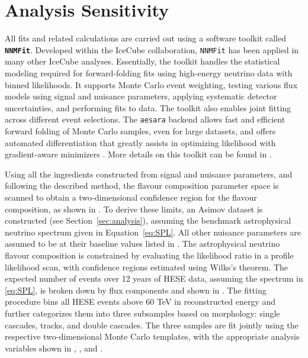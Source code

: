 \section{Analysis Sensitivity}
\label{sec:sensitivty}
All fits and related calculations are carried out using a software toolkit called \textbf{\texttt{NNMFit}}. Developed within the IceCube collaboration, \texttt{NNMFit} has been applied in many other IceCube analyses. Essentially, the toolkit handles the statistical modeling required for forward-folding fits using high-energy neutrino data with binned likelihoods. It supports Monte Carlo event weighting, testing various flux models using signal and nuisance parameters, applying systematic detector uncertainties, and performing fits to data. The toolkit also enables joint fitting across different event selections. The \texttt{aesara} backend  allows fast and efficient forward folding of Monte Carlo samples, even for large datasets, and offers automated differentiation that greatly assists in optimizing likelihood with gradient-aware minimizers . More details on this toolkit can be found in . 

Using all the ingredients constructed from signal and nuisance parameters, and following the described method, the flavour composition parameter space is scanned to obtain a two-dimensional confidence region for the flavour composition, as shown in . To derive these limits, an Asimov dataset is constructed (see Section~\ref{sec:analysis}), assuming the benchmark astrophysical neutrino spectrum given in Equation~\ref{eq:SPL}. All other nuisance parameters are assumed to be at their baseline values listed in . The astrophysical neutrino flavour composition is constrained by evaluating the likelihood ratio in a profile likelihood scan, with confidence regions estimated using Wilks’s theorem. The expected number of events over 12 years of HESE data, assuming the spectrum in \ref{eq:SPL}, is broken down by flux components and shown in . The fitting procedure bins all HESE events above 60 TeV in reconstructed energy and further categorizes them into three subsamples based on morphology: single cascades, tracks, and double cascades. The three samples are fit jointly using the respective two-dimensional Monte Carlo templates, with the appropriate analysis variables shown in , , and .

